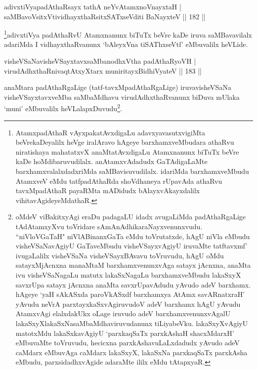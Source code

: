 
\begin{shl}
adivxtiVyapadAthaRsayx tathA neYvA\s \s tamxnoV\s nayxtaH |\\
saMBavoV\s sitxVtividhayxthaRsitxSATxseVditi BaNayxteV \hfill || 182 ||
\end{shl}

\begin{artha}
\footnote{AtamxpadAthaR vAyxpakatAvxdigaLu adavxyavasutxvigiMta beVrekaDeyalilx heVge iralAravo hAgeye barxhamxveMbudara athaRvu niratishaya mahatatxvX anaMtatAvxdigaLu Atamxnanunx biTuTx beVre kaDe hoMdibaruvudilalx. anAtamxvAdadudx GaTAdigaLaMte barxhamxvalalxdadxriMda saMBavisuvudilalx. idariMda barxhamxveMbudu  AtamxveV eMdu tatfpadAthaRda shoVdhaneya rUpavAda athaRvu tavxMpadAthaR payaRMta mADidudx bAlayxvAkayxdalilx vihitavAgideyeMdathaR.}adivxtiVya padAthaRvU Atamxnanunx biTuTx beVre kaDe iruva saMBavavilalx adariMda I vidhayxthaRvanunx `bAleyxVna tiSAThxseVtf' eMbuvalilx heVLide.
\end{artha}


\begin{shl}
visheVSaNavisheVSayxtavxsaMbanodhxV\s tha padAthaRyoVH |\\
virudAdhxthaRnivaqtAtxyX\s tarx muniritayxBidhiVyateV \hfill || 183 ||
\end{shl}

\begin{artha}
anaMtara padAthaRgaLige (tatf-tavxMpadAthaRgaLige) iruva\break visheVSaNa visheVSayxtavxveMba saMbaMdhavu virudAdhxthaRvanunx biDuva mUlaka `muni' eMbuvalilx heVLalapxDuvudu\footnote{oMdeV viBakitxyAgi eraDu padagaLU idadx avugaLiMda padAthaRgaLige tAdAtamxyXvu toVridare sAmAnAdhikaraNayxvenunxvudu. ``niVloVGaTaH" niVlABinanxGaTa eMdu toVrutatxde, hAgU niVla eMbudu visheVSaNavAgiyU GaTaveMbudu visheVSayxvAgiyU iruvaMte tatftavxmf' ivugaLalilx visheVSaNa visheVSayxBAvavu toVruvudu, hAgU oMdu satayxMjAcnxna manaMtaM barxhamxvenunxvAga satayx jAcnxna, anaMta ivu visheVSaNagaLu matutx lakaSxNagaLu barxhamxveMbudu lakaSxyX savxrUpa satayx jAcnxna anaMta savxrUpavAdudu yAvudo adeV barxhamx. hAgeye `yaH sAkASxda paroVkASxdf barxhamxya AtAmx savARnatxraH' yAvudu neVrA parxtayxkaSxvAgiruvudoV adeV barxhamx hAgU yAvudu AtamxvAgi elalxdakUkx oLage iruvudo adeV barxhamxvenunxvAgalU lakaSxyXlakaSxNasaMbaMdhaviruvudanunx tiLiyabeVku. lakaSxyXvAgiyU matotxMdu lakaSxkavAgiyU `parxkaqSaTx parxkAshaH shacxMdarxH' eMbuvaMte toVruvudu, hecicxna parxkAshavuLaLxdadudx yAvudo adeV caMdarx eMbuvAga caMdarx lakaSxyX, lakaSxNa parxkaqSaTx parxkAsha eMbudu, parxsidadhxvAgide adaraMte ililx eMdu tAtapxyaR.}.
\end{artha}

